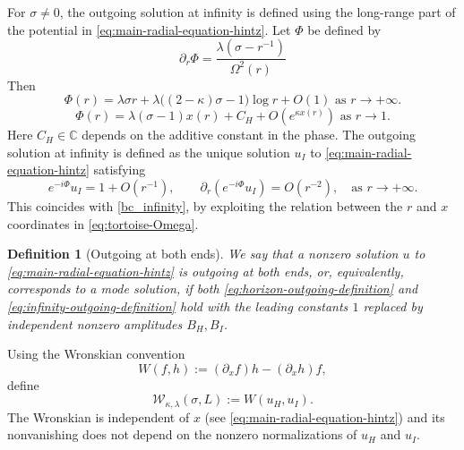 \documentclass[11pt]{article}
\numberwithin{equation}{section}
\newtheorem{definition}[theorem]{Definition}
\begin{document}
	
	For $\sigma\neq0$, the outgoing solution at infinity is defined using
	the long-range part of the potential in \eqref{eq:main-radial-equation-hintz}. Let $\Phi$ be defined by 
	\begin{equation}
		\partial_r\Phi
		= \frac{ \lambda(\sigma-r^{-1}) }{\Omega^2(r)}
		\label{eq:long-range-phase-derivative}
	\end{equation}
	Then 
	\begin{equation}
		\Phi(r)=\lambda\sigma r
		+\lambda\bigl((2-\kappa)\sigma-1\bigr)\log r+O(1)
		\text{ as  } r\to+\infty.
		\label{eq:long-range-phase-expansion}
	\end{equation}
	\begin{equation}
		\Phi(r)=\lambda(\sigma-1) x(r)\mathbin{{+}}{C_H}
		+O(e^{\kappa x(r)})
		\text{ as  } r\to1.
		\label{eq:short-range-phase-expansion}
	\end{equation}
	{Here $C_H\in\mathbb C$ depends on the additive constant in the phase.}
	The outgoing solution at infinity is defined as the unique solution $u_I$ to \eqref{eq:main-radial-equation-hintz} satisfying
	\begin{equation}
		e^{-i\Phi}u_I=1+O(r^{-1}),
		\qquad
		\partial_r\!\left(e^{-i\Phi}u_I\right)=O(r^{-2}), \quad \text{as } r \to+\infty.
		\label{eq:infinity-outgoing-definition}
	\end{equation}
	This coincides with \eqref{bc_infinity}, by exploiting the relation between the $r$ and $x$ coordinates in \eqref{eq:tortoise-Omega}.
	
	
	
	\begin{definition}[Outgoing at both ends]
		We say that a {nonzero} solution $u$ to \eqref{eq:main-radial-equation-hintz} is outgoing at both ends, {or, equivalently, corresponds to a mode solution}, if both \eqref{eq:horizon-outgoing-definition} and \eqref{eq:infinity-outgoing-definition} {hold with the leading constants $1$ replaced by independent nonzero amplitudes $B_H,B_I$}.
	\end{definition}
	
	Using the Wronskian convention
	\[
	W(f,h):=(\partial_x f) h-(\partial_x h)f,
	\]
	define
	\begin{equation}
		\mathcal W_{\kappa,\lambda}(\sigma,L):=W(u_H,u_I).
		\label{eq:Wronskian-hintz-section}
	\end{equation}
	The Wronskian is independent of $x$ (see \eqref{eq:main-radial-equation-hintz}) and its nonvanishing does not depend
	on the nonzero normalizations of $u_H$ and $u_I$.
	
\end{document}
